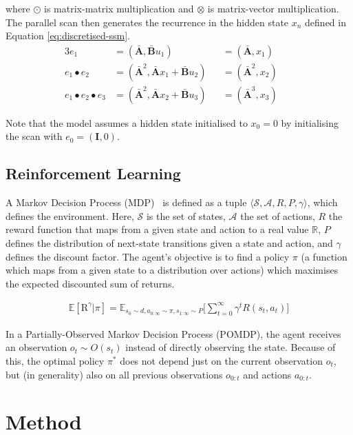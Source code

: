 \documentclass{article}
\newcommand{\oldop}{\bullet}
\begin{document}
where $\odot$ is matrix-matrix multiplication and $\otimes$ is matrix-vector multiplication. The parallel scan then generates the recurrence in the hidden state $x_n$ defined in Equation \ref{eq:discretised-ssm}.
\begin{alignat}{3}
e_1 &= (\mathbf{\bar{A}}, \mathbf{\bar{B}}u_1) &&= (\mathbf{\bar{A}}, x_1)&&\\
e_1 \oldop e_2 &= (\mathbf{\bar{A}}^2, \mathbf{\bar{A}} x_1 + \mathbf{\bar{B}}u_2) &&= (\mathbf{\bar{A}}^2, x_2)&&\\
e_1 \oldop e_2 \oldop e_3 &= (\mathbf{\bar{A}}^2, \mathbf{\bar{A}} x_2 + \mathbf{\bar{B}}u_3) &&= (\mathbf{\bar{A}}^3, x_3)&&
\end{alignat}

Note that the model assumes a hidden state initialised to $x_0=0$ by initialising the scan with $e_0=(\mathbf{I}, 0)$.

\subsection{Reinforcement Learning}
\label{subsect:rl-background}

A Markov Decision Process (MDP)~\citep{sutton2018reinforcement} is defined as a tuple $\langle \mathcal{S}, \mathcal{A}, R, P, \gamma\rangle$, which defines the environment. Here, $\mathcal{S}$ is the set of states, $\mathcal{A}$ the set of actions, $R$ the reward function that maps from a given state and action to a real value $\mathbb{R}$, $P$ defines the distribution of next-state transitions given a state and action, and $\gamma$ defines the discount factor. The agent's objective is to find a policy $\pi$ (a function which maps from a given state to a distribution over actions) which maximises the expected discounted sum of returns. 

\begin{align}
     \mathbb{E}[\text{R}^{\gamma} | \pi] = \mathbb{E}_{s_0\sim d, a_{0:\infty}\sim\pi, s_{1:\infty}\sim P}\Big[ 
    \sum_{t=0}^{\infty}\gamma^t R(s_t, a_t) \Big] \nonumber
\end{align}


In a Partially-Observed Markov Decision Process (POMDP), the agent receives an observation $o_t \sim O(s_t)$ instead of directly observing the state. Because of this, the optimal policy $\pi^*$ does not depend just on the current observation $o_t$, but (in generality) also on all previous observations $o_{0:t}$ and actions $a_{0:t}$.

\section{Method}
\label{sec:Method}
\end{document}
